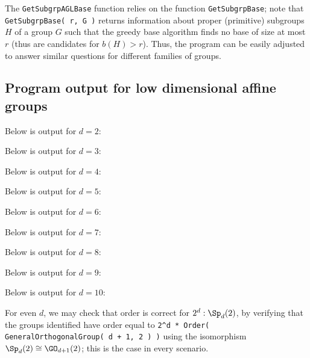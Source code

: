 The \texttt{GetSubgrpAGLBase} function relies on the function \texttt{GetSubgrpBase}; note that \texttt{GetSubgrpBase( r, G )} returns information about proper (primitive) subgroups $H$ of a group $G$ such that the greedy base algorithm finds no base of size at most $r$ (thus are candidates for $b(H) > r$). Thus, the program can be easily adjusted to answer similar questions for different families of groups.\label{app:subgrps_base_len}




% 

\subsection{Program output for low dimensional affine groups}\label{app:agl_output}

Below is output for $d = 2$:



Below is output for $d = 3$:



Below is output for $d = 4$:



Below is output for $d = 5$:



Below is output for $d = 6$:



Below is output for $d = 7$:



Below is output for $d = 8$:



Below is output for $d = 9$:



Below is output for $d = 10$:



For even $d$, we may check that order is correct for $2^d : \Sp_d(2)$, by verifying that the groups identified have order equal to \texttt{2\^{}d * Order( GeneralOrthogonalGroup( d + 1, 2 ) )} using the isomorphism $\Sp_d(2) \cong \GO_{d+1}(2)$; this is the case in every scenario.

% 